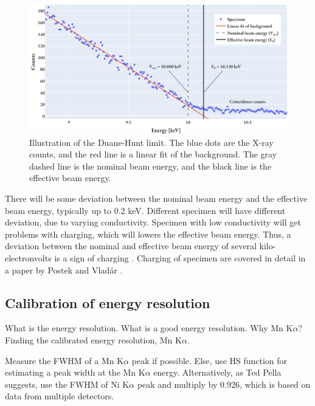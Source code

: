 \begin{figure}[ht]
    \centering
    \includegraphics[width=0.8\linewidth]{figures/Duane-Hunt.png}
    \caption{
        Illustration of the Duane-Hunt limit.
        The blue dots are the X-ray counts, and the red line is a linear fit of the background.
        The gray dashed line is the nominal beam energy, and the black line is the effective beam energy.
    }
    \label{fig:duanehunt}
\end{figure}


There will be some deviation between the nominal beam energy and the effective beam energy, typically up to 0.2 keV.
Different specimen will have different deviation, due to varying conductivity.
Specimen with low conductivity will get problems with charging, which will lowers the effective beam energy.
Thus, a deviation between the nominal and effective beam energy of several kilo-electronvolts is a sign of charging \cite{dtsaii_2_manipulating_spectra}.
Charging of specimen are covered in detail in a paper by Postek and Vladár \cite{postek_charging_2015}.






\subsection{Calibration of energy resolution}
\label{theory:qc:energyres}

What is the energy resolution.
What is a good energy resolution.
Why Mn K$\alpha$?
Finding the calibrated energy resolution, Mn K$\alpha$.

Measure the FWHM of a Mn K$\alpha$ peak if possible.
Else, use HS function for estimating a peak width at the Mn K$\alpha$ energy.
Alternatively, as Ted Pella suggests, use the FWHM of Ni K$\alpha$ peak and multiply by 0.926, which is based on data from multiple detectors.

